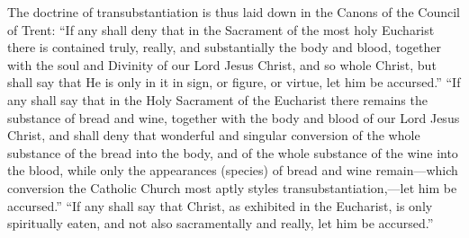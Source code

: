 \documentclass[]{book}
\begin{document}
The doctrine of transubstantiation is thus laid down in the Canons of the Council of Trent: ``If any shall deny that in the Sacrament of the most holy Eucharist there is contained truly, really, and substantially the body and blood, together with the soul and Divinity of our Lord Jesus Christ, and so whole Christ, but shall say that He is only in it in sign, or figure, or virtue, let him be accursed.'' ``If any shall say that in the Holy Sacrament of the Eucharist there remains the substance of bread and wine, together with the body and blood of our Lord Jesus Christ, and shall deny that wonderful and singular conversion of the whole substance of the bread into the body, and of the whole substance of the wine into the blood, while only the appearances (species) of bread and wine remain---which conversion the Catholic Church most aptly styles transubstantiation,---let him be accursed.'' ``If any shall say that Christ, as exhibited in the Eucharist, is only spiritually eaten, and not also sacramentally and really, let him be accursed.''
\end{document}
